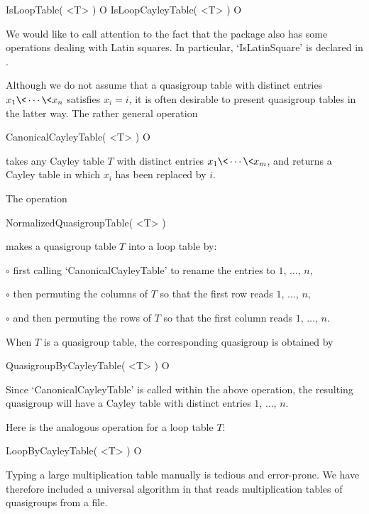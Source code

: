 \>IsLoopTable( <T> ) O
\>IsLoopCayleyTable( <T> ) O

We would like to call attention to the fact that the package 
also has some operations dealing with Latin squares. In particular,
`IsLatinSquare' is declared in .


Although we do not assume that a quasigroup table with distinct entries
$x_1\<\cdots\<x_n$ satisfies $x_i=i$, it is often desirable to present
quasigroup tables in the latter way. The rather general operation

\>CanonicalCayleyTable( <T> ) O

takes any Cayley table $T$ with distinct entries $x_1\<\cdots\<x_m$, and
returns a Cayley table in which $x_i$ has been replaced by $i$.

The operation

\>NormalizedQuasigroupTable( <T> )

makes a quasigroup table $T$ into a loop table by:
\beginlist%
\item{$\circ$} first calling `CanonicalCayleyTable' to rename the entries to $1$,
    $\dots$, $n$,
\item{$\circ$} then permuting the columns of $T$ so that the first row reads
    $1$, $\dots$, $n$,
\item{$\circ$} and then permuting the rows of $T$ so that the first column
    reads $1$, $\dots$, $n$.
\endlist


When $T$ is a quasigroup table, the corresponding quasigroup is obtained by

\>QuasigroupByCayleyTable( <T> ) O

Since `CanonicalCayleyTable' is called within the above operation, the
resulting quasigroup will have a Cayley table with distinct entries $1$,
$\dots$, $n$.

Here is the analogous operation for a loop table $T$:

\>LoopByCayleyTable( <T> ) O


Typing a large multiplication table manually is tedious and error-prone. We
have therefore included a universal algorithm in {\LOOPS} that reads
multiplication tables of quasigroups from a file.

